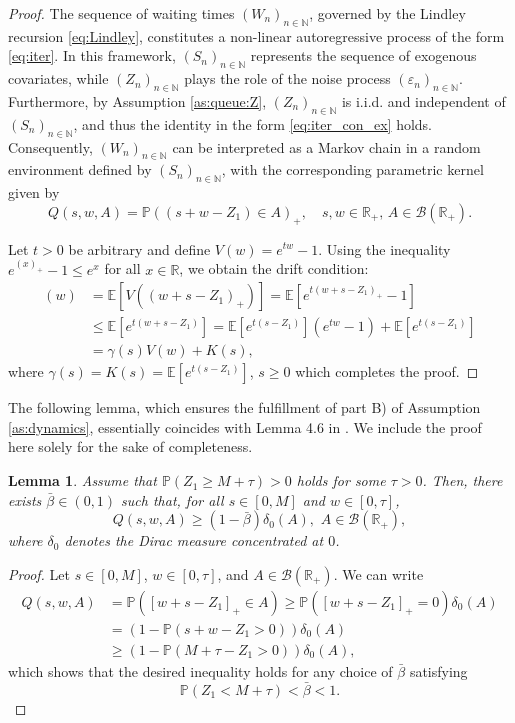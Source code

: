 \documentclass[a4paper,10pt]{article}
\newtheorem{lemma}[theorem]{Lemma}
\newcommand{\N}{\mathbb{N}}
\newcommand{\R}{\mathbb{R}}
\newcommand{\B}{\mathcal{B}}
\renewcommand{\P}{\mathbb{P}}
\newcommand{\eps}{\varepsilon}
\begin{document}
\begin{proof}

The sequence of waiting times $(W_n)_{n\in\N}$, governed by the Lindley recursion \eqref{eq:Lindley}, constitutes a non-linear autoregressive process of the form \eqref{eq:iter}. In this framework, $(S_n)_{n\in\N}$ represents the sequence of exogenous covariates, while $(Z_n)_{n\in\N}$ plays the role of the noise process $(\eps_n)_{n\in\N}$.
Furthermore, by  Assumption \ref{as:queue:Z}, $(Z_n)_{n\in\N}$ is i.i.d. and independent of $(S_n)_{n\in\N}$, and thus the identity in the form \eqref{eq:iter_con_ex} holds.
Consequently, $(W_n)_{n\in\N}$ can be interpreted as a Markov chain in a random environment defined by $(S_n)_{n\in\N}$, with the corresponding parametric kernel given by
$$
Q(s,w,A) = \P((s+w-Z_1) \in A)_+, \quad s,w \in \R_{+},\, A \in \B(\R_{+}).
$$

	
Let $t > 0$ be arbitrary and define $V(w) = e^{tw} - 1$.  
Using the inequality $e^{(x)_+} - 1 \leq e^x$ for all $x \in \mathbb{R}$, we obtain the drift condition:
\begin{align*}
	[Q(s)V](w) &= \mathbb{E}\left[V((w+s-Z_1)_+)\right] = \mathbb{E}\left[e^{t(w+s-Z_1)_+}-1\right] \\
	&\leq \mathbb{E}\left[e^{t(w+s-Z_1)}\right] = \mathbb{E}\left[e^{t(s-Z_1)}\right] \left(e^{tw}-1\right) + \mathbb{E}\left[e^{t(s-Z_1)}\right]
	\\
	&=\gamma (s)V(w)+K(s),
\end{align*}
where $\gamma(s) = K(s) = \mathbb{E}\left[e^{t(s-Z_1)}\right]$, $s \geq 0$ which completes the proof.
\end{proof}

The following lemma, which ensures the fulfillment of part B) of Assumption \ref{as:dynamics}, essentially coincides with Lemma 4.6 in \cite{lovas}. 
We include the proof here solely for the sake of completeness. 
\begin{lemma}\label{lem:q:tech}
	Assume that $\P (Z_1\ge M+\tau)>0$ holds for some $\tau>0$. Then, there exists $\bar{\beta} \in (0,1)$ such that, for all $s \in [0,M]$ and $w \in [0,\tau]$,
	$$
	Q(s,w,A) \geq (1 - \bar{\beta}) \delta_0(A), \,\, A \in \mathcal{B}(\mathbb{R}_{+}),
	$$
	where $\delta_0$ denotes the Dirac measure concentrated at $0$.
\end{lemma}

\begin{proof}
	Let $s \in [0,M]$, $w \in [0,\tau]$, and $A\in\B(\R_{+})$. We can write
	\begin{align*}
		Q(s,w,A) &= \P \left(\left[w + s - Z_1\right]_+ \in A \right) \geq \P \left(\left[w + s - Z_1\right]_+ = 0 \right)\delta_0(A) \\
		&= \left(1 - \P \left(s + w - Z_1 > 0 \right)\right)\delta_0(A) \\
		&\geq \left(1 - \P \left(M + \tau - Z_1 > 0 \right)\right)\delta_0(A),
	\end{align*}
		which shows that the desired inequality holds for any choice of $\bar{\beta}$ satisfying 
		$$
		\P\left(Z_1 < M + \tau \right) < \bar{\beta} < 1.
		$$
\end{proof}
\end{document}
